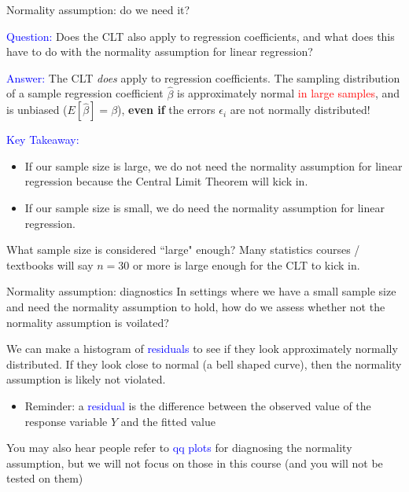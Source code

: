 \documentclass[10pt,t]{beamer}
\begin{document}
\begin{frame}{Normality assumption: do we need it?}

\textcolor{blue}{Question:} Does the CLT also apply to regression coefficients, and what does this have to do with the normality assumption for linear regression?

\vspace{0.3cm} 

\textcolor{blue}{Answer:} The CLT \textit{does} apply to regression coefficients. The sampling distribution of a sample regression coefficient $\hat{\beta}$ is approximately normal \textcolor{red}{in large samples}, and is unbiased ($E[\hat{\beta}] = \beta$), \textbf{even if} the errors $\epsilon_i$ are not normally distributed!

\vspace{0.3cm} 

\textcolor{blue}{Key Takeaway:} 
\begin{itemize}
	\item If our sample size is large, we do not need the normality assumption for linear regression because the Central Limit Theorem will kick in.
	\item If our sample size is small, we do need the normality assumption for linear regression.
\end{itemize}

\small What sample size is considered ``large" enough? Many statistics courses / textbooks will say $n = 30$ or more is large enough for the CLT to kick in. %

\end{frame}

\begin{frame}{Normality assumption: diagnostics}
In settings where we have a small sample size and need the normality assumption to hold, how do we assess whether not the normality assumption is voilated?

\vspace{0.3cm}

We can make a histogram of \textcolor{blue}{residuals} to see if they look approximately normally distributed. If they look close to normal (a bell shaped curve), then the normality assumption is likely not violated.

\vspace{0.3cm}

\begin{itemize}
	\item[] Reminder: a \textcolor{blue}{residual} is the difference between the observed value of the response variable $Y$ and the fitted value 
\end{itemize}

\vspace{0.3cm}

\small You may also hear people refer to \textcolor{blue}{qq plots} for diagnosing the normality assumption, but we will not focus on those in this course (and you will not be tested on them)

\end{frame}
\end{document}
